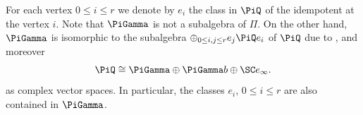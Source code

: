\begin{Remark}
 For each vertex $0\leq i\leq r$ we denote by $e_i$ the class in $\PiQ$ of the idempotent at the vertex $i$. Note that $\PiGamma$ is not a subalgebra of $\Pi$. On the other hand, $\PiGamma$ is isomorphic to the subalgebra $\oplus_{0 \leq i,j \leq r} e_j\PiQ e_i$ of $\PiQ$ due to \cite[Lemma~3.2]{craw2019punctual}, and moreover
 \begin{equation} \label{eq:PiQdecomp}
 \PiQ \cong \PiGamma \oplus \PiGamma b \oplus \SC e_\infty.
\end{equation}
as complex vector spaces. In particular, the classes $e_i$, $0 \leq i \leq r$ are also contained in $\PiGamma$.
\end{Remark}
